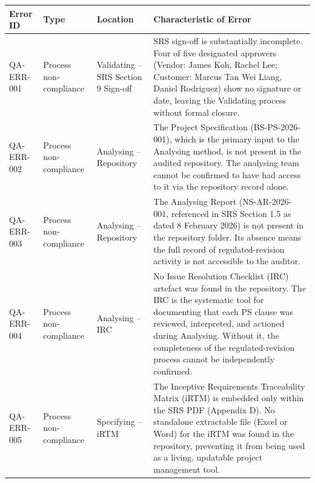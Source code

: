 \documentclass[11pt,a4paper]{article}
\begin{document}
\begin{longtable}{|p{}|p{}|p{}|p{}|}
\hline
\rowcolor{tableheader}
\textbf{Error ID} & \textbf{Type} & \textbf{Location} & \textbf{Characteristic of Error} \\
\hline
\endhead

\rowcolor{highsev}
QA-ERR-001 & Process non-compliance & Validating -- SRS Section 9 Sign-off & SRS sign-off is substantially incomplete. Four of five designated approvers (Vendor: James Koh, Rachel Lee; Customer: Marcus Tan Wei Liang, Daniel Rodriguez) show no signature or date, leaving the Validating process without formal closure. \\
\hline

\rowcolor{medsev}
QA-ERR-002 & Process non-compliance & Analysing -- Repository & The Project Specification (BS-PS-2026-001), which is the primary input to the Analysing method, is not present in the audited repository. The analysing team cannot be confirmed to have had access to it via the repository record alone. \\
\hline

\rowcolor{medsev}
QA-ERR-003 & Process non-compliance & Analysing -- Repository & The Analysing Report (NS-AR-2026-001, referenced in SRS Section 1.5 as dated 8 February 2026) is not present in the repository folder. Its absence means the full record of regulated-revision activity is not accessible to the auditor. \\
\hline

\rowcolor{medsev}
QA-ERR-004 & Process non-compliance & Analysing -- IRC & No Issue Resolution Checklist (IRC) artefact was found in the repository. The IRC is the systematic tool for documenting that each PS clause was reviewed, interpreted, and actioned during Analysing. Without it, the completeness of the regulated-revision process cannot be independently confirmed. \\
\hline

\rowcolor{medsev}
QA-ERR-005 & Process non-compliance & Specifying -- iRTM & The Inceptive Requirements Traceability Matrix (iRTM) is embedded only within the SRS PDF (Appendix D). No standalone extractable file (Excel or Word) for the iRTM was found in the repository, preventing it from being used as a living, updatable project management tool. \\
\hline

\end{longtable}

\end{document}
